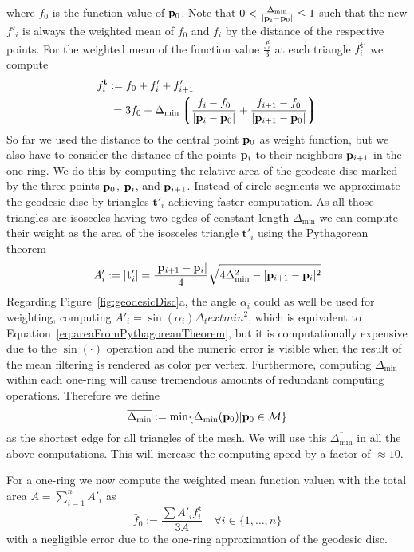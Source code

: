 where $f_0$ is the function value of $\mathbf{p}_0$. Note that $0 < \frac{
\Delta_\text{min}}{|\mathbf{p}_i - \mathbf{p}_0|} \leq 1$ such that the new 
$f'_i$ is always the weighted mean of $f_0$ and $f_i$ by the distance of the
respective points. For the weighted mean of the function value $\frac{f_i^t}{3}$ at 
each triangle $f^{\mathbf{t}'}_i$ we compute
\begin{align}
	f^{\mathbf{t}}_i & := f_0 + f'_i + f'_{i+1} \\
	& \: = 3f_0 + \Delta_\text{min}\left\lgroup\frac{f_i - f_0}{|\mathbf{p}_i - \mathbf{p}_0|} + 
	\frac{f_{i+1} - f_0}{|\mathbf{p}_{i+1} - \mathbf{p}_0|}\right\rgroup
\end{align}
So far we used the distance to the central point $\mathbf{p}_0$ as weight 
function, but we also have to consider the distance of the points 
$\mathbf{p}_i$ to their neighbors $\mathbf{p}_{i+1}$ in the one-ring. We do this 
by computing the relative area of the geodesic disc marked by the three points 
$\mathbf{p}_0$, $\mathbf{p}_i$, and $\mathbf{p}_{i+1}$. Instead of circle 
segments we approximate the geodesic disc by triangles $\mathbf{t}'_i$ achieving 
faster computation. As all those triangles are isosceles having two egdes of 
constant length $\Delta_\text{min}$ we can compute their weight as the area of the 
isosceles triangle $\mathbf{t}'_i$ using the Pythagorean theorem
\begin{equation}
	A'_i := |\mathbf{t}'_i| = \frac{|\mathbf{p}_{i+1} - \mathbf{p}_i|}{4}
	\sqrt{4\Delta_\text{min}^2 - |\mathbf{p}_{i+1} - \mathbf{p}_i|^2}
	\label{eq:areaFromPythagoreanTheorem}
\end{equation}
Regarding Figure~\ref{fig:geodesicDisc}a, the angle $\alpha_i$ could as well be 
used for weighting, computing $A'_i = \sin(\alpha_i)\Delta_text{min}^2$, which is 
equivalent to Equation~\ref{eq:areaFromPythagoreanTheorem}, but it 
is computationally expensive due to the $\sin(\cdot)$ operation and the numeric error 
is visible when the result of the mean filtering is rendered as color per 
vertex. Furthermore, computing $\Delta_\text{min}$ within each one-ring will cause 
tremendous amounts of redundant computing operations. Therefore we define 
\begin{equation}
	\overline{\Delta_\text{min}} := \min\{\Delta_\text{min}(\mathbf{p}_0) | 
	\mathbf{p}_0 \in \mathcal{M}\}
\end{equation} 
as the shortest edge for all triangles of the mesh. We will use this 
$\overline{\Delta_\text{min}}$ in all the above computations. This will increase the 
computing speed by a factor of $\approx 10$. 

For a one-ring we now compute the weighted mean function valuen with the total area
$A = \displaystyle\sum_{i=1}^nA'_i$ as
\begin{equation}
	\bar{f}_0 := \frac{\sum A'_if_i^\mathbf{t}}{3A} \quad \forall i \in \{1,\ldots,n\}
	\label{eq:weightedMean}
\end{equation}
with a negligible error due to the one-ring approximation of the geodesic 
disc.

